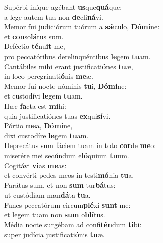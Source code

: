 \oddverse Supérbi iníque agébant \textbf{us}que\textbf{quá}que:~\*\\
\oddverse a lege autem tua non \textbf{de}cli\textbf{ná}vi.\\
\evenverse Memor fui judiciórum tuórum a \textbf{sǽ}culo, \textbf{Dó}\textbf{mi}ne:~\*\\
\evenverse et \textbf{con}so\textbf{lá}tus sum.\\
\oddverse Deféctio \textbf{té}nu\textbf{it} me,~\*\\
\oddverse pro peccatóribus derelinquéntibus \textbf{le}gem \textbf{tu}am.\\
\evenverse Cantábiles mihi erant justificati\textbf{ó}nes \textbf{tu}æ,~\*\\
\evenverse in loco peregrinati\textbf{ó}nis \textbf{me}æ.\\
\oddverse Memor fui nocte nóminis \textbf{tu}i, \textbf{Dó}\textbf{mi}ne:~\*\\
\oddverse et custodívi \textbf{le}gem \textbf{tu}am.\\
\evenverse Hæc \textbf{fa}cta est \textbf{mi}hi:~\*\\
\evenverse quia justificatiónes tuas \textbf{ex}qui\textbf{sí}vi.\\
\oddverse Pórtio \textbf{me}a, \textbf{Dó}\textbf{mi}ne,~\*\\
\oddverse dixi custodíre \textbf{le}gem \textbf{tu}am.\\
\evenverse Deprecátus sum fáciem tuam in toto \textbf{cor}de \textbf{me}o:~\*\\
\evenverse miserére mei secúndum e\textbf{ló}quium \textbf{tu}um.\\
\oddverse Cogitávi \textbf{vi}as \textbf{me}as:~\*\\
\oddverse et convérti pedes meos in testi\textbf{mó}nia \textbf{tu}a.\\
\evenverse Parátus sum, et non \textbf{sum} tur\textbf{bá}tus:~\*\\
\evenverse ut custódiam man\textbf{dá}ta \textbf{tu}a.\\
\oddverse Funes peccatórum circum\textbf{plé}xi \textbf{sunt} me:~\*\\
\oddverse et legem tuam non \textbf{sum} o\textbf{blí}tus.\\
\evenverse Média nocte surgébam ad confi\textbf{tén}dum \textbf{ti}bi:~\*\\
\evenverse super judícia justificati\textbf{ó}nis \textbf{tu}æ.\\
